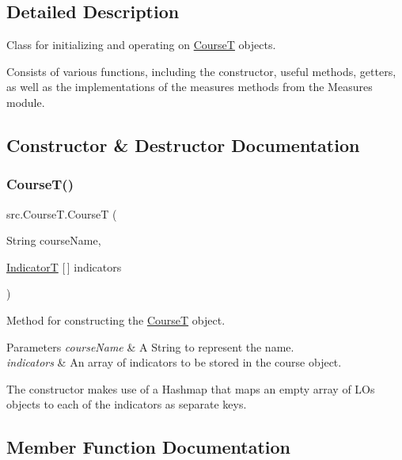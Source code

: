 \subsection{Detailed Description}
Class for initializing and operating on \hyperlink{classsrc_1_1CourseT}{CourseT} objects. 

Consists of various functions, including the constructor, useful methods, getters, as well as the implementations of the measures methods from the Measures module. 

\subsection{Constructor \& Destructor Documentation}
\mbox{\label{classsrc_1_1CourseT_a1823da8802163805bfc9e387557730de}} 
\subsubsection{\texorpdfstring{Course\+T()}{CourseT()}}
{\footnotesize\ttfamily src.\+Course\+T.\+CourseT (\begin{DoxyParamCaption}\item[{String}]{course\+Name,  }\item[{\hyperlink{enumsrc_1_1IndicatorT}{IndicatorT} \mbox{[}$\,$\mbox{]}}]{indicators }\end{DoxyParamCaption})}



Method for constructing the \hyperlink{classsrc_1_1CourseT}{CourseT} object. 


\begin{DoxyParams}{Parameters}
{\em course\+Name} & A String to represent the name. \\
\hline
{\em indicators} & An array of indicators to be stored in the course object.\\
\hline
\end{DoxyParams}
The constructor makes use of a Hashmap that maps an empty array of L\+Os objects to each of the indicators as separate keys. 

\subsection{Member Function Documentation}
\mbox{\label{classsrc_1_1CourseT_af1c3eb729e731d0b14f289655ce531ee}} 
